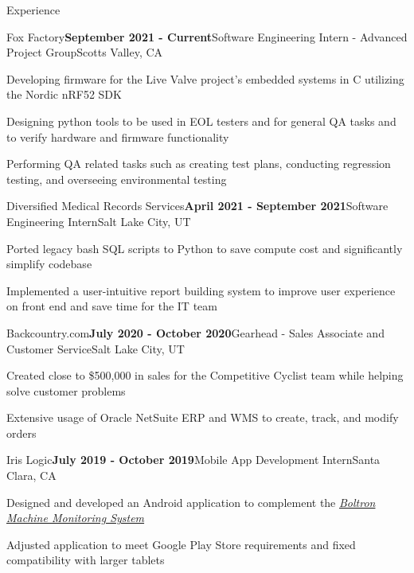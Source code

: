 \documentclass{resume}
\begin{document}
\begin{rSection}{\large Experience}

\begin{rSubsection}{Fox Factory}{\bf{September 2021 - Current}}{Software Engineering Intern - Advanced Project Group}{Scotts Valley, CA }
\item Developing firmware for the Live Valve project's embedded systems in C utilizing the Nordic nRF52 SDK
\item Designing python tools to be used in EOL testers and for general QA tasks and to verify hardware and firmware functionality
\item Performing QA related tasks such as creating test plans, conducting regression testing, and overseeing environmental testing
\end{rSubsection}

\begin{rSubsection}{Diversified Medical Records Services}{\bf{April 2021 - September 2021}}{Software Engineering Intern}{Salt Lake City, UT }
\item Ported legacy bash SQL scripts to Python to save compute cost and significantly simplify codebase
\item Implemented a user-intuitive report building system to improve user experience on front end and save time for the IT team
\end{rSubsection}

\begin{rSubsection}{Backcountry.com}{\bf{July 2020 - October 2020}}{Gearhead - Sales Associate and Customer Service}{Salt Lake City, UT }
\item Created close to \$500,000 in sales for the Competitive Cyclist team while helping solve customer problems
\item Extensive usage of Oracle NetSuite ERP and WMS to create, track, and modify orders
\end{rSubsection}

\begin{rSubsection}{Iris Logic}{\bf{July 2019 - October 2019}}{Mobile App Development Intern}{Santa Clara, CA }
 \item Designed and developed an Android application to complement the \emph{\href{https://irislogic.com/boltron-machine-monitoring-system/}{Boltron Machine Monitoring System}}
\item Adjusted application to meet Google Play Store requirements and fixed compatibility with larger tablets
\end{rSubsection}

\end{rSection}
\end{document}
